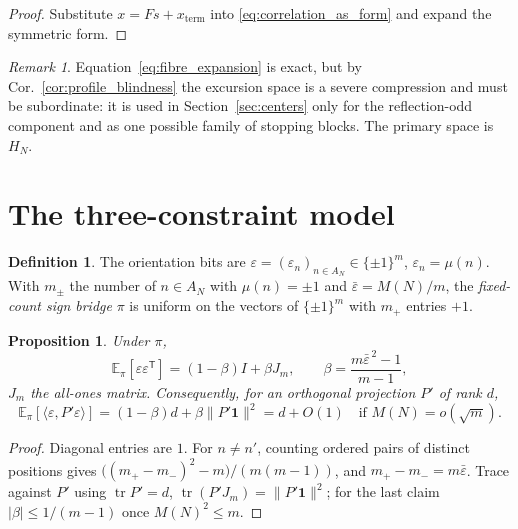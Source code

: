 \documentclass[11pt]{amsart}
\numberwithin{equation}{section}
\theoremstyle{plain}
\newtheorem{proposition}[theorem]{Proposition}
\theoremstyle{definition}
\newtheorem{definition}[theorem]{Definition}
\theoremstyle{remark}
\newtheorem{remark}[theorem]{Remark}
\DeclareMathOperator{\tr}{tr}
\begin{document}
\begin{proof}
Substitute $x=Fs+x_{\mathrm{term}}$ into
\eqref{eq:correlation_as_form} and expand the symmetric form.
\end{proof}

\begin{remark}
\label{rem:exc_is_subordinate}
Equation~\eqref{eq:fibre_expansion} is exact, but by
Cor.~\ref{cor:profile_blindness} the excursion space is a severe
compression and must be subordinate: it is used in
Section~\ref{sec:centers} only for the reflection-odd component and as
one possible family of stopping blocks. The primary space is $H_N$.
\end{remark}

\section{The three-constraint model}
\label{sec:three_conditionings}

\begin{definition}
\label{def:mask}
The orientation bits are
$\varepsilon=(\varepsilon_n)_{n\in A_N}\in\{\pm1\}^m$,
$\varepsilon_n=\mu(n)$. With $m_\pm$ the number of $n\in A_N$ with
$\mu(n)=\pm1$ and $\bar\varepsilon=M(N)/m$, the \emph{fixed-count sign
bridge} $\pi$ is uniform on the vectors of $\{\pm1\}^m$ with $m_+$
entries $+1$.
\end{definition}

\begin{proposition}
\label{prop:bridge_covariance}
Under $\pi$,
\begin{equation}
\mathbb E_\pi[\varepsilon\varepsilon^{\mathsf T}]=(1-\beta)I+\beta J_{m},
\qquad \beta=\frac{m\bar\varepsilon^{\,2}-1}{m-1},
\label{eq:bridge_covariance}
\end{equation}
$J_m$ the all-ones matrix. Consequently, for an orthogonal projection
$P'$ of rank $d$,
\begin{equation}
\mathbb E_\pi[\langle\varepsilon,P'\varepsilon\rangle]
=(1-\beta)d+\beta\|P'\mathbf 1\|^2=d+O(1)
\quad\text{if }M(N)=o(\sqrt m).
\label{eq:bridge_projection_mean}
\end{equation}
\end{proposition}

\begin{proof}
Diagonal entries are $1$. For $n\ne n'$, counting ordered pairs of
distinct positions gives
$\bigl((m_+-m_-)^2-m\bigr)/(m(m-1))$, and $m_+-m_-=m\bar\varepsilon$.
Trace against $P'$ using $\tr P'=d$, $\tr(P'J_m)=\|P'\mathbf 1\|^2$;
for the last claim $|\beta|\le 1/(m-1)$ once $M(N)^2\le m$.
\end{proof}
\end{document}
